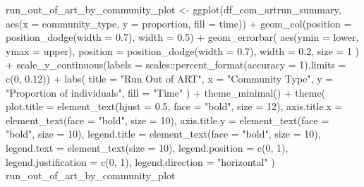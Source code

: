 \documentclass[
  letterpaper,
  DIV=11,
  numbers=noendperiod]{scrartcl}
\newenvironment{Shaded}{\begin{snugshade}}{\end{snugshade}}
\newcommand{\AttributeTok}[1]{\textcolor[rgb]{0.40,0.45,0.13}{#1}}
\newcommand{\DecValTok}[1]{\textcolor[rgb]{0.68,0.00,0.00}{#1}}
\newcommand{\FloatTok}[1]{\textcolor[rgb]{0.68,0.00,0.00}{#1}}
\newcommand{\FunctionTok}[1]{\textcolor[rgb]{0.28,0.35,0.67}{#1}}
\newcommand{\NormalTok}[1]{\textcolor[rgb]{0.00,0.23,0.31}{#1}}
\newcommand{\OtherTok}[1]{\textcolor[rgb]{0.00,0.23,0.31}{#1}}
\newcommand{\SpecialCharTok}[1]{\textcolor[rgb]{0.37,0.37,0.37}{#1}}
\newcommand{\StringTok}[1]{\textcolor[rgb]{0.13,0.47,0.30}{#1}}
\begin{document}
\begin{Shaded}
\begin{Highlighting}[]
\NormalTok{run\_out\_of\_art\_by\_community\_plot }\OtherTok{\textless{}{-}} \FunctionTok{ggplot}\NormalTok{(df\_com\_artrun\_summary, }\FunctionTok{aes}\NormalTok{(}\AttributeTok{x =}\NormalTok{ community\_type, }\AttributeTok{y =}\NormalTok{ proportion, }\AttributeTok{fill =}\NormalTok{ time)) }\SpecialCharTok{+}
  \FunctionTok{geom\_col}\NormalTok{(}\AttributeTok{position =} \FunctionTok{position\_dodge}\NormalTok{(}\AttributeTok{width =} \FloatTok{0.7}\NormalTok{), }\AttributeTok{width =} \FloatTok{0.5}\NormalTok{) }\SpecialCharTok{+}
  \FunctionTok{geom\_errorbar}\NormalTok{(}
    \FunctionTok{aes}\NormalTok{(}\AttributeTok{ymin =}\NormalTok{ lower, }\AttributeTok{ymax =}\NormalTok{ upper),}
    \AttributeTok{position =} \FunctionTok{position\_dodge}\NormalTok{(}\AttributeTok{width =} \FloatTok{0.7}\NormalTok{),}
    \AttributeTok{width =} \FloatTok{0.2}\NormalTok{,}
    \AttributeTok{size =} \DecValTok{1}
\NormalTok{  ) }\SpecialCharTok{+}
  \FunctionTok{scale\_y\_continuous}\NormalTok{(}\AttributeTok{labels =}\NormalTok{ scales}\SpecialCharTok{::}\FunctionTok{percent\_format}\NormalTok{(}\AttributeTok{accuracy =} \DecValTok{1}\NormalTok{),}\AttributeTok{limits =} \FunctionTok{c}\NormalTok{(}\DecValTok{0}\NormalTok{, }\FloatTok{0.12}\NormalTok{)) }\SpecialCharTok{+}
  \FunctionTok{labs}\NormalTok{(}
    \AttributeTok{title =} \StringTok{"Run Out of ART"}\NormalTok{,}
    \AttributeTok{x =} \StringTok{"Community Type"}\NormalTok{,}
    \AttributeTok{y =} \StringTok{"Proportion of individuals"}\NormalTok{,}
    \AttributeTok{fill =} \StringTok{"Time"}
\NormalTok{  ) }\SpecialCharTok{+}
  \FunctionTok{theme\_minimal}\NormalTok{() }\SpecialCharTok{+}
  \FunctionTok{theme}\NormalTok{(}
    \AttributeTok{plot.title =} \FunctionTok{element\_text}\NormalTok{(}\AttributeTok{hjust =} \FloatTok{0.5}\NormalTok{, }\AttributeTok{face =} \StringTok{"bold"}\NormalTok{, }\AttributeTok{size =} \DecValTok{12}\NormalTok{),}
    \AttributeTok{axis.title.x =} \FunctionTok{element\_text}\NormalTok{(}\AttributeTok{face =} \StringTok{"bold"}\NormalTok{, }\AttributeTok{size =} \DecValTok{10}\NormalTok{),}
    \AttributeTok{axis.title.y =} \FunctionTok{element\_text}\NormalTok{(}\AttributeTok{face =} \StringTok{"bold"}\NormalTok{, }\AttributeTok{size =} \DecValTok{10}\NormalTok{),}
    \AttributeTok{legend.title =} \FunctionTok{element\_text}\NormalTok{(}\AttributeTok{face =} \StringTok{"bold"}\NormalTok{, }\AttributeTok{size =} \DecValTok{10}\NormalTok{),}
    \AttributeTok{legend.text =} \FunctionTok{element\_text}\NormalTok{(}\AttributeTok{size =} \DecValTok{10}\NormalTok{),}
    \AttributeTok{legend.position =} \FunctionTok{c}\NormalTok{(}\DecValTok{0}\NormalTok{, }\DecValTok{1}\NormalTok{),}
    \AttributeTok{legend.justification =} \FunctionTok{c}\NormalTok{(}\DecValTok{0}\NormalTok{, }\DecValTok{1}\NormalTok{),}
    \AttributeTok{legend.direction =} \StringTok{"horizontal"}
\NormalTok{  )}
\NormalTok{run\_out\_of\_art\_by\_community\_plot}
\end{Highlighting}
\end{Shaded}
\end{document}
